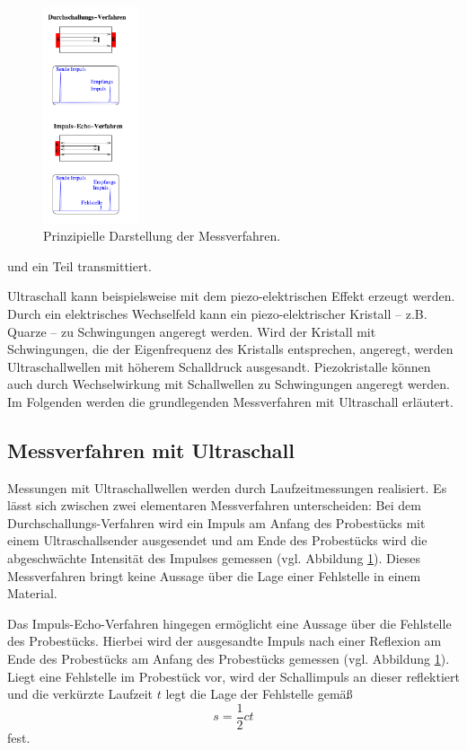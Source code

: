 \begin{figure}
	\centering
	\includegraphics[width=0.25\textwidth]{Bilder/Messverfahren.png}
	\caption{Prinzipielle Darstellung der Messverfahren. \cite{Anleitung}}
	\label{fig:echo}
\end{figure}
und ein Teil transmittiert.

Ultraschall kann beispielsweise mit dem piezo-elektrischen Effekt erzeugt werden.
Durch ein elektrisches Wechselfeld kann ein piezo-elektrischer Kristall -- z.B. Quarze -- zu
Schwingungen angeregt werden. Wird der Kristall mit
Schwingungen, die der Eigenfrequenz des Kristalls entsprechen, angeregt, werden
Ultraschallwellen mit höherem Schalldruck ausgesandt. Piezokristalle können auch durch
Wechselwirkung mit Schallwellen zu Schwingungen angeregt werden.
Im Folgenden werden die grundlegenden Messverfahren mit Ultraschall erläutert.
\subsection{Messverfahren mit Ultraschall}
Messungen mit Ultraschallwellen werden durch Laufzeitmessungen realisiert.
Es lässt sich zwischen zwei elementaren Messverfahren unterscheiden:
Bei dem Durchschallungs-Verfahren wird ein Impuls am Anfang des Probestücks mit einem 
Ultraschallsender ausgesendet
und am Ende des Probestücks wird die abgeschwächte Intensität des Impulses gemessen (vgl.
Abbildung \ref{fig:echo}).
Dieses Messverfahren bringt keine Aussage über die Lage einer Fehlstelle in einem
Material. 

Das Impuls-Echo-Verfahren hingegen ermöglicht eine Aussage über die Fehlstelle des Probestücks.
Hierbei wird der ausgesandte Impuls nach einer Reflexion am Ende des Probestücks am Anfang des
Probestücks gemessen (vgl. Abbildung \ref{fig:echo}).
Liegt eine Fehlstelle im Probestück vor, wird der Schallimpuls an dieser reflektiert und die
verkürzte Laufzeit $t$ legt die Lage der Fehlstelle gemäß
\begin{equation}
	\label{eqn:laufzeit}
	s = \frac{1}{2} c t
\end{equation}
fest.
\FloatBarrier

